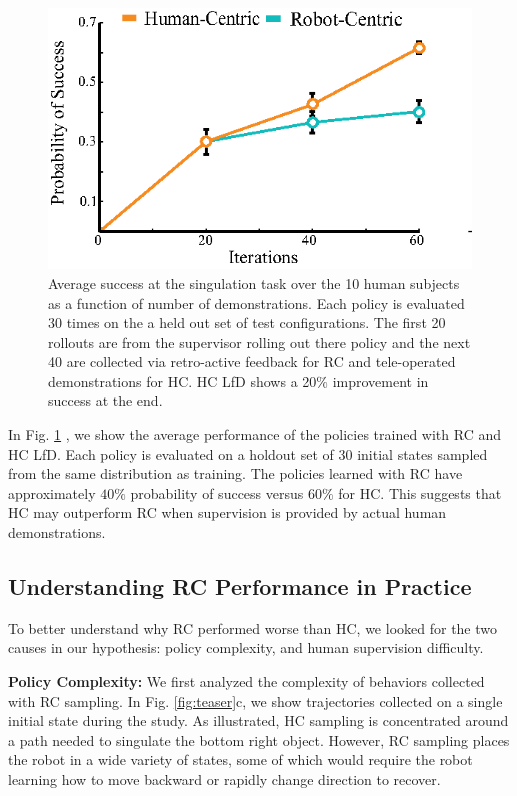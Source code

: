 \documentclass[10pt, conference]{ieeeconf}      %
\begin{document}
\begin{figure}
\centering
\includegraphics{f_figs/izzy_reward.eps}
\caption{
    \footnotesize
Average success at the singulation task over the 10 human subjects as a function of number of demonstrations. Each policy is evaluated 30 times on the a held out set of test configurations. The first 20 rollouts are from the supervisor rolling out there policy and the next 40 are collected via retro-active feedback for RC and tele-operated demonstrations for HC. HC LfD shows a 20$\%$ improvement in success at the end. }
\vspace*{-20pt}

\label{fig:izzy_rw}
\end{figure}

In Fig. \ref{fig:izzy_rw} , we show the average performance of the policies trained with RC and HC LfD. Each policy is evaluated on a holdout set of 30 initial states sampled from the same distribution as training.
The policies learned with RC have approximately $40\%$ probability of success versus $60\%$ for HC.
This suggests that HC may outperform RC when supervision is provided by actual human demonstrations.

\subsection{Understanding RC Performance in Practice}
To better understand why RC performed worse than HC, we looked for the two causes in our hypothesis: policy complexity, and human supervision difficulty.

\noindent\textbf{Policy Complexity: }We first analyzed the complexity of behaviors collected with RC sampling. In Fig. \ref{fig:teaser}c, we show trajectories collected on a single initial state during the study. As illustrated, HC sampling is concentrated around a path needed to singulate the bottom right object. However, RC sampling places the robot in a wide variety of states, some of which would require the robot learning how to move backward or rapidly change direction to recover. 
\end{document}
